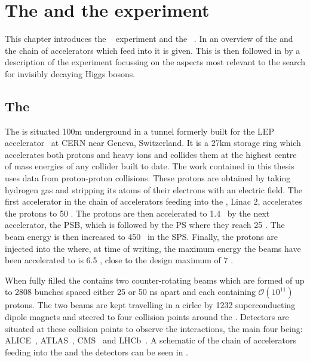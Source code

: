 \chapter{The \LHC and the \CMS experiment}
\label{chap:detector}
This chapter introduces the \CMS~\cite{Chatrchyan:2008aa} experiment and the \LHC~\cite{1748-0221-3-08-S08001}. In  an overview of the \LHC and the chain of accelerators which feed into it is given. This is then followed in  by a description of the \CMS experiment focussing on the aspects most relevant to the search for invisibly decaying Higgs bosons.

\section{The \LHC}
\label{sec:lhc}
The \LHC is situated 100m underground in a tunnel formerly built for the LEP accelerator~\cite{lepdesign} at CERN near Geneva, Switzerland. It is a 27km storage ring which accelerates both protons and heavy ions and collides them at the highest centre of mass energies of any collider built to date. The work contained in this thesis uses data from proton-proton collisions. These protons are obtained by taking hydrogen gas and stripping its atoms of their electrons with an electric field. The first accelerator in the chain of accelerators feeding into the \LHC, Linac 2, accelerates the protons to 50 \MeV. The protons are then accelerated to 1.4 \GeV~by the next accelerator, the \ac{PSB}, which is followed by the \ac{PS} where they reach 25 \GeV. The beam energy is then increased to 450 \GeV~in the \ac{SPS}. Finally, the protons are injected into the \LHC where, at time of writing, the maximum energy the beams have been accelerated to is 6.5 \TeV, close to the design maximum of 7 \TeV.

When fully filled the \LHC contains two counter-rotating beams which are formed of up to 2808 bunches spaced either 25 or 50 ns apart and each containing $\mathcal{O}(10^{11})$ protons. The two beams are kept travelling in a cirlce by 1232 superconducting dipole magnets and steered to four collision points around the \LHC. Detectors are situated at these collision points to observe the interactions, the main four being: ALICE~\cite{Aamodt:2008zz}, ATLAS~\cite{Aad:1129811}, CMS~\cite{Chatrchyan:2008aa} and LHCb~\cite{Alves:2008zz}. A schematic of the chain of accelerators feeding into the \LHC and the \LHC detectors can be seen in .

